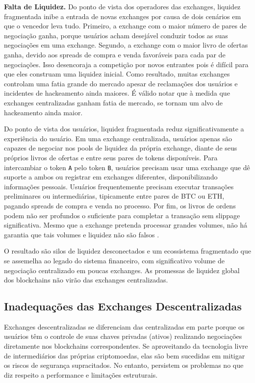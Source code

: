 \documentclass[UTF8,nofonts]{article}
\begin{document}
\begin{multicols}{2}
\textbf{Falta de Liquidez.} Do ponto de vista dos operadores das exchanges, liquidez fragmentada inibe a entrada de novas exchanges por causa de dois cenários em que o vencedor leva tudo. Primeiro, a exchange com o maior número de pares de negociação ganha, porque usuários acham desejável conduzir todos as suas negociações em uma exchange. Segundo, a exchange com o maior livro de ofertas ganha, devido aos spreads de compra e venda favoráveis para cada par de negociações. Isso desencoraja a competição por novos entrantes pois é difícil para que eles construam uma liquidez inicial. Como resultado, muitas exchanges controlam uma fatia grande do mercado apesar de reclamações dos usuários e incidentes de hackeamento ainda maiores. É válido notar que à medida que exchanges centralizadas ganham fatia de mercado, se tornam um alvo de hackeamento ainda maior.

Do ponto de vista dos usuários, liquidez fragmentada reduz significativamente a experiência do usuário. Em uma exchange centralizada, usuários apenas são capazes de negociar nos pools de liquidez da própria exchange, diante de seus próprios livros de ofertas e entre seus pares de tokens disponíveis. Para intercambiar o token \verb|A| pelo token \verb|B|, usuários precisam usar uma exchange que dê suporte a ambos ou registrar em exchanges diferentes, disponibilizando informações pessoais. Usuários frequentemente precisam executar transações preliminares ou intermediárias, tipicamente entre pares de BTC ou ETH, pagando spreads de compra e venda no processo. Por fim, os livros de ordens podem não ser profundos o suficiente para completar a transação sem slippage significativa. Mesmo que a exchange pretenda processar grandes volumes, não há garantia que tais volumes e liquidez não são falsos \cite{fakevolume}.

O resultado são silos de liquidez desconectados e um ecossistema fragmentado que se assemelha ao legado do sistema financeiro, com significativo volume de negociação centralizado em poucas exchanges. As promessas de liquidez global dos blockchains não virão das exchanges centralizadas.

\subsection{Inadequações das Exchanges Descentralizadas}
Exchanges descentralizadas se diferenciam das centralizadas em parte porque os usuários têm o controle de suas chaves privadas (ativos) realizando negociações diretamente nos blockchains correspondentes. Se aproveitando da tecnologia livre de intermediários das próprias criptomoedas, elas são bem sucedidas em mitigar os riscos de segurança supracitados. No entanto, persistem os problemas no que diz respeito a performance e limitações estruturais.


\end{multicols}
\end{document}
